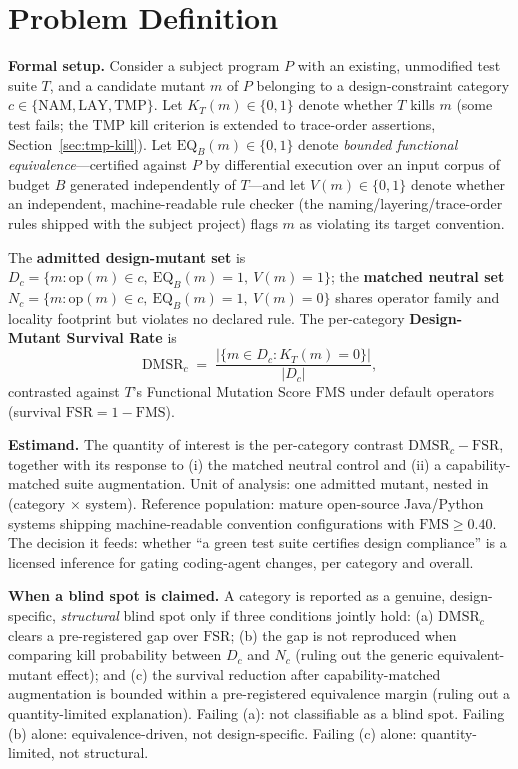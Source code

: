 \documentclass[conference]{IEEEtran}
\newcommand{\dmsr}{\mathrm{DMSR}}
\newcommand{\fsr}{\mathrm{FSR}}
\newcommand{\fms}{\mathrm{FMS}}
\newcommand{\eqb}{\mathrm{EQ}_B}
\begin{document}
\section{Problem Definition}\label{sec:problem}

\textbf{Formal setup.} Consider a subject program $P$ with an existing, unmodified test suite $T$, and a candidate mutant $m$ of $P$ belonging to a design-constraint category $c \in \{\text{NAM}, \text{LAY}, \text{TMP}\}$. Let $K_T(m) \in \{0,1\}$ denote whether $T$ kills $m$ (some test fails; the TMP kill criterion is extended to trace-order assertions, Section~\ref{sec:tmp-kill}). Let $\eqb(m) \in \{0,1\}$ denote \emph{bounded functional equivalence}---certified against $P$ by differential execution over an input corpus of budget $B$ generated independently of $T$---and let $V(m) \in \{0,1\}$ denote whether an independent, machine-readable rule checker (the naming/layering/trace-order rules shipped with the subject project) flags $m$ as violating its target convention.

The \textbf{admitted design-mutant set} is
$D_c = \{m : \mathrm{op}(m) \in c,\ \eqb(m)=1,\ V(m)=1\}$;
the \textbf{matched neutral set}
$N_c = \{m : \mathrm{op}(m) \in c,\ \eqb(m)=1,\ V(m)=0\}$
shares operator family and locality footprint but violates no declared rule. The per-category \textbf{Design-Mutant Survival Rate} is
\[
\dmsr_c \;=\; \frac{|\{m \in D_c : K_T(m)=0\}|}{|D_c|},
\]
contrasted against $T$'s Functional Mutation Score $\fms$ under default operators (survival $\fsr = 1-\fms$).

\textbf{Estimand.} The quantity of interest is the per-category contrast $\dmsr_c - \fsr$, together with its response to (i) the matched neutral control and (ii) a capability-matched suite augmentation. Unit of analysis: one admitted mutant, nested in (category $\times$ system). Reference population: mature open-source Java/Python systems shipping machine-readable convention configurations with $\fms \geq 0.40$. The decision it feeds: whether ``a green test suite certifies design compliance'' is a licensed inference for gating coding-agent changes, per category and overall.

\textbf{When a blind spot is claimed.} A category is reported as a genuine, design-specific, \emph{structural} blind spot only if three conditions jointly hold: (a) $\dmsr_c$ clears a pre-registered gap over $\fsr$; (b) the gap is not reproduced when comparing kill probability between $D_c$ and $N_c$ (ruling out the generic equivalent-mutant effect); and (c) the survival reduction after capability-matched augmentation is bounded within a pre-registered equivalence margin (ruling out a quantity-limited explanation). Failing (a): not classifiable as a blind spot. Failing (b) alone: equivalence-driven, not design-specific. Failing (c) alone: quantity-limited, not structural.
\end{document}
